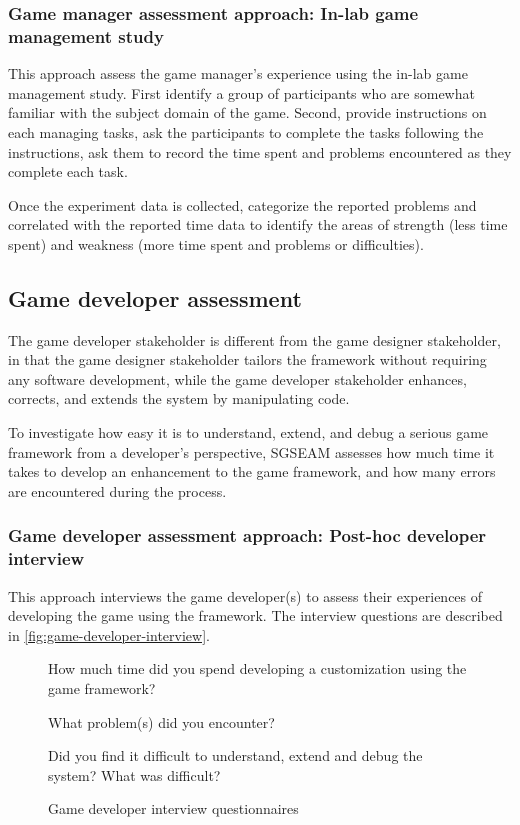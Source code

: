 \documentclass[11pt,oneside]{book}
\begin{document}
\subsubsection{Game manager assessment approach: In-lab game management study}
\label{In-lab game management study}

This approach assess the game manager's experience using the in-lab game management study.  First identify a group 
of participants who are somewhat familiar with the subject domain of the game. Second, provide instructions on 
each managing tasks, ask the participants to complete the tasks following the instructions, ask them to record 
the time spent and problems encountered as they complete each task.

Once the experiment data is collected, categorize the reported problems and correlated with the reported time data 
to identify the areas of strength (less time spent) and weakness (more time spent and problems or difficulties). 

\subsection{Game developer assessment}

The game developer stakeholder is different from the game designer stakeholder, in that the
game designer stakeholder tailors the framework without requiring any software
development, while the game developer stakeholder enhances, corrects, and extends the system by
manipulating code. 

To investigate how easy it is to understand, extend, and debug a serious game
framework from a developer's perspective, SGSEAM assesses how much time it takes to develop an
enhancement to the game framework, and how many errors are encountered
during the process.

\subsubsection{Game developer assessment approach: Post-hoc developer interview}
\label{Post-hoc game developer interview}

This approach interviews the game developer(s) to assess their experiences of developing the game 
using the framework. The interview questions are described in \autoref{fig:game-developer-interview}.  
 
\begin{figure}[ht!]
\begin{mybox}
\begin{compactenum}
\item How much time did you spend developing a customization using the game framework?
\item What problem(s) did you encounter?
\item Did you find it difficult to understand, extend and debug the system? What was difficult?\\
\end{compactenum}
\end{mybox}
\caption{Game developer interview questionnaires}
\label{fig:game-developer-interview}  
\end{figure}
\end{document}
